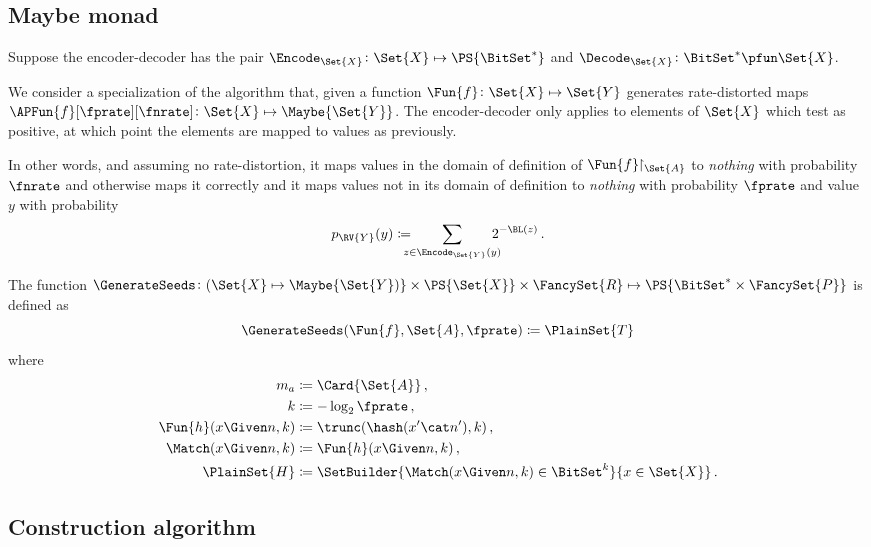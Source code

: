 \documentclass[ ../main.tex]{subfiles}
\begin{document}
\subsection{Maybe monad}
Suppose the encoder-decoder has the pair $\Encode_{\Set{X}} \colon \Set{X} \mapsto \PS{\BitSet^*}$ and $\Decode_{\Set{X}} \colon \BitSet^* \pfun \Set{X}$.

We consider a specialization of the algorithm that, given a function $\Fun{f} \colon \Set{X} \mapsto \Set{Y}$ generates rate-distorted maps $\APFun{f}[\fprate][\fnrate] \colon \Set{X} \mapsto \Maybe{\Set{Y}}$.
The encoder-decoder only applies to elements of $\Set{X}$ which test as positive, at which point the elements are mapped to values as previously.

In other words, and assuming no rate-distortion, it maps values in the domain of definition of $\Fun{f}\!\!\restriction_{\Set{A}}$ to \emph{nothing} with probability $\fnrate$ and otherwise maps it correctly and it maps values not in its domain of definition to \emph{nothing} with probability $\fprate$ and value $y$ with probability
\begin{equation}
	p_{\RV{Y}}(y) \coloneqq \!\!\!\!\! \sum_{z \in \Encode_{\Set{Y}}(y)} \!\!\!\!\! 2^{-\BL(z)}\,.
\end{equation}

The function $\GenerateSeeds \colon (\Set{X} \mapsto \Maybe{\Set{Y})} \times \PS{\Set{X}} \times \FancySet{R} \mapsto \PS{\BitSet^* \times \FancySet{P}}$ is defined as
\begin{equation}
	\GenerateSeeds(\Fun{f}, \Set{A}, \fprate) \coloneqq \PlainSet{T}
	\end{equation}
where
\begin{equation}
\begin{split}
	m_a						&\coloneqq \Card{\Set{A}}\,,\\
	k						&\coloneqq -\log_2 \fprate\,,\\
	\Fun{h}(x \Given n,k)	&\coloneqq \trunc(\hash(x' \cat n'),k)\,,\\
	\Match(x \Given n,k)	&\coloneqq \Fun{h}(x \Given n,k)\,,\\
	\PlainSet{H} 			&\coloneqq \SetBuilder{\Match(x \Given n,k) \in \BitSet^{k}}{x \in \Set{X}}\,.
\end{split}
\end{equation}

\subsection{Construction algorithm}
\end{document}
